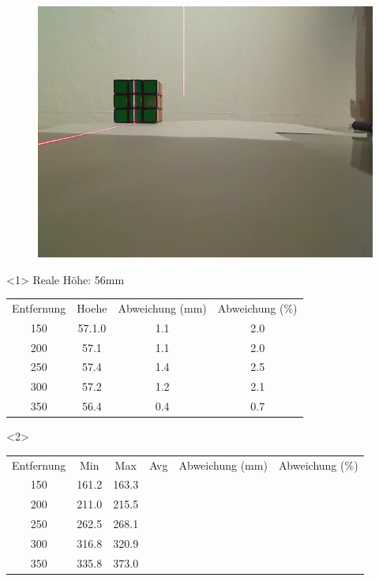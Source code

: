 \documentclass{beamer}
\begin{document}
\begin{frame}
\begin{figure}
\begin{minipage}{0.32\linewidth}
		\end{minipage}
		\hfill
		\begin{minipage}{0.32\linewidth}
			\includegraphics[width=\linewidth]{includes/test_dist_3}
		\end{minipage}
	\end{figure}

	\begin{onlyenv}
		Reale Höhe: 56mm
		\begin{tabular}{c|c|c|c}
			Entfernung & Hoehe & Abweichung (mm) & Abweichung (\%) \\
			150 & 57.1.0 & 1.1 & 2.0\\
			200 & 57.1 & 1.1 & 2.0\\
			250 & 57.4 & 1.4 & 2.5\\
			300 & 57.2 & 1.2 & 2.1\\
			350 & 56.4 & 0.4 & 0.7
		\end{tabular}
	\end{onlyenv}
	\begin{onlyenv}
		\begin{tabular}{c|c|c|c|c|c}
			Entfernung & Min & Max & Avg & Abweichung (mm) & Abweichung (\%)\\
			150 & 161.2 & 163.3\\
			200 & 211.0 & 215.5\\
			250 & 262.5 & 268.1\\
			300 & 316.8 & 320.9\\
			350 & 335.8 & 373.0
		\end{tabular}
	\end{onlyenv}

\end{frame}
\end{document}
